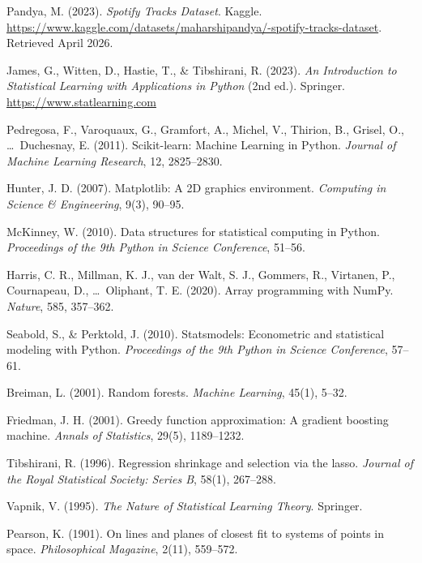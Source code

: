 \documentclass[12pt, oneside]{book}
\begin{document}
\begin{enumerate}[label={[\arabic*]}]
    \item Pandya, M. (2023). \textit{Spotify Tracks Dataset}. Kaggle. \url{https://www.kaggle.com/datasets/maharshipandya/-spotify-tracks-dataset}. Retrieved April 2026.
    \item James, G., Witten, D., Hastie, T., \& Tibshirani, R. (2023). \textit{An Introduction to Statistical Learning with Applications in Python} (2nd ed.). Springer. \url{https://www.statlearning.com}
    \item Pedregosa, F., Varoquaux, G., Gramfort, A., Michel, V., Thirion, B., Grisel, O., \ldots\ Duchesnay, E. (2011). Scikit-learn: Machine Learning in Python. \textit{Journal of Machine Learning Research}, 12, 2825--2830.
    \item Hunter, J. D. (2007). Matplotlib: A 2D graphics environment. \textit{Computing in Science \& Engineering}, 9(3), 90--95.
    \item McKinney, W. (2010). Data structures for statistical computing in Python. \textit{Proceedings of the 9th Python in Science Conference}, 51--56.
    \item Harris, C. R., Millman, K. J., van der Walt, S. J., Gommers, R., Virtanen, P., Cournapeau, D., \ldots\ Oliphant, T. E. (2020). Array programming with NumPy. \textit{Nature}, 585, 357--362.
    \item Seabold, S., \& Perktold, J. (2010). Statsmodels: Econometric and statistical modeling with Python. \textit{Proceedings of the 9th Python in Science Conference}, 57--61.
    \item Breiman, L. (2001). Random forests. \textit{Machine Learning}, 45(1), 5--32.
    \item Friedman, J. H. (2001). Greedy function approximation: A gradient boosting machine. \textit{Annals of Statistics}, 29(5), 1189--1232.
    \item Tibshirani, R. (1996). Regression shrinkage and selection via the lasso. \textit{Journal of the Royal Statistical Society: Series B}, 58(1), 267--288.
    \item Vapnik, V. (1995). \textit{The Nature of Statistical Learning Theory}. Springer.
    \item Pearson, K. (1901). On lines and planes of closest fit to systems of points in space. \textit{Philosophical Magazine}, 2(11), 559--572.
\end{enumerate}
 
\end{document}
